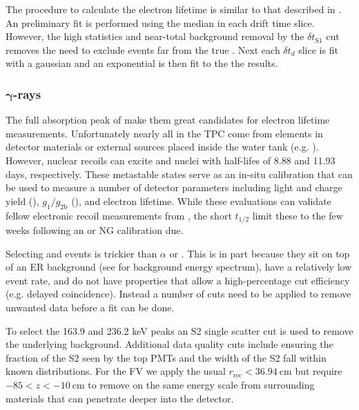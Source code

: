 The procedure to calculate the electron lifetime is similar to that described in
.  An preliminary fit is performed using the median \stwob in each drift time
slice.  However, the high statistics and near-total background removal by the $\delta t_{\mathrm{S1}}$ cut
removes the need to exclude events far from the true \metakr.  Next each $\delta t_d$ slice is fit with a gaussian and an exponential
is then fit to the the results.



\subsubsection{$\mathbf{\gamma}$-rays}
\label{subsec:electron_lifetimes_measurement_gammas}
The full absorption peak of \gammarays make them great candidates for electron lifetime measurements.  Unfortunately nearly all
\gammarays in the TPC come from elements in detector materials or external sources placed inside the water tank
(e.g. ).  However, nuclear recoils can excite  and  nuclei with half-lifes
of 8.88 and 11.93 days, respectively.  These metastable states serve as an in-situ calibration that can be used to measure a number of
detector parameters including light and charge yield (), $g_1/g_{2\mathrm{b}}$
(), and electron lifetime.  While these evaluations can validate fellow
electronic recoil measurements from , the short $t_{1/2}$ limit these to the few weeks following an \ambe or NG
calibration due.

Selecting  and  events is trickier than $\alpha$ or .  This is in part because they sit
on top of an ER background (see  for background energy spectrum), have a
relatively low event rate, and do not have properties that allow a high-percentage cut
efficiency (e.g.  delayed coincidence).  Instead a number of cuts need to be applied to remove unwanted data before a fit
can be done.

To select the 163.9 and 236.2 keV peaks an S2 single scatter cut is used to remove the underlying background.  Additional data quality
cuts include ensuring the fraction of the S2 seen by the top PMTs and the width of the S2 fall within known distributions.  For the FV
we apply the usual $r_{\mathrm{rec}} < 36.94\ \mathrm{cm}$ but require $-85 < z < -10\ \mathrm{cm}$ to remove \gammarays on the same
energy scale from surrounding materials that can penetrate deeper into the detector.

